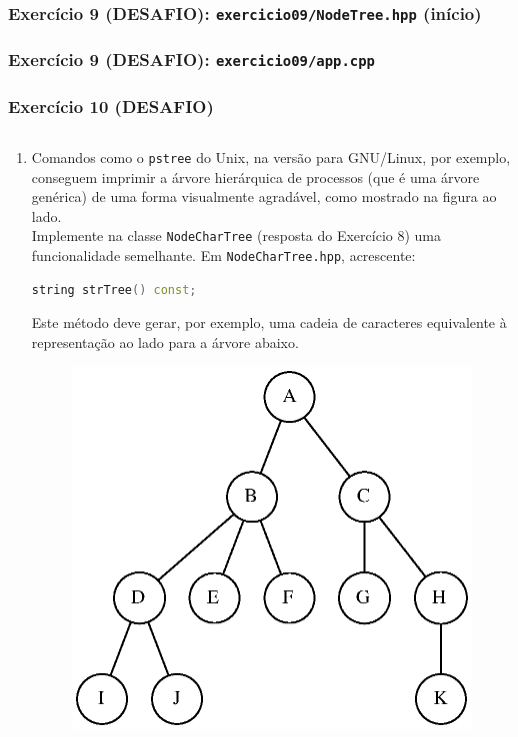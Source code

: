 \documentclass[aspectratio=169]{beamer}
\begin{document}
\begin{frame}[fragile]\frametitle{Exercício 9 (DESAFIO): \texttt{exercicio09/NodeTree.hpp} (início)}
\fontsize{3pt}{5pt}\selectfont{

}
\end{frame}

\begin{frame}[fragile]\frametitle{Exercício 9 (DESAFIO): \texttt{exercicio09/app.cpp}}

\end{frame}

\begin{frame}[fragile]\frametitle{Exercício 10 (DESAFIO)}
\begin{columns}
\begin{column}{0.6\linewidth}
\begin{enumerate}
	\scriptsize
	\setcounter{enumi}{9}
	\item Comandos como o \texttt{pstree} do Unix, na versão para GNU/Linux, por exemplo, conseguem imprimir a árvore hierárquica de processos (que é uma árvore genérica) de uma forma visualmente agradável, como mostrado na figura ao lado.\\
Implemente na classe \texttt{NodeCharTree} (resposta do Exercício 8) uma funcionalidade semelhante. Em \texttt{NodeCharTree.hpp}, acrescente:
\begin{lstlisting}[language=C++,basicstyle=\ttfamily\tiny]
string strTree() const;
\end{lstlisting}
Este método deve gerar, por exemplo, uma cadeia de caracteres equivalente à representação ao lado para a árvore abaixo.
\begin{figure}[h]
	\centering
	\includegraphics[height=0.25\paperheight]{imagens/arvore3.eps}

\end{figure}
\end{enumerate}
\end{column}
\end{columns}
\end{frame}
\end{document}
